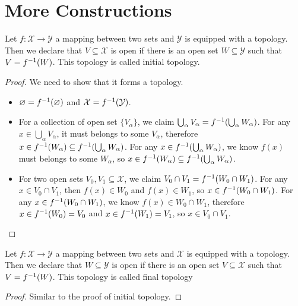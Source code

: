 \documentclass[./main.tex]{subfiles}
\begin{document}
\section{More Constructions}

\begin{definition}
  Let $f : \mathcal{X} \rightarrow \mathcal{Y}$ a mapping between two sets
  and $\mathcal{Y}$ is equipped with a topology.
  Then we declare that $V \subseteq \mathcal{X}$ is open
  if there is an open set $W \subseteq \mathcal{Y}$
  such that $V = f^{-1}(W)$. This topology is called initial topology.
\end{definition}
\begin{proof}
  We need to show that it forms a topology.
  \begin{itemize}
    \item $\varnothing = f^{-1}(\varnothing)$ and $\mathcal{X} = f^{-1}(\mathcal{Y})$.
    \item For a collection of open set $\{ V_\alpha \}$,
          we claim $\bigcup_\alpha V_\alpha = f^{-1}(\bigcup_\alpha W_\alpha)$.
          For any $x \in \bigcup_\alpha V_\alpha$, it must belongs to some $V_\alpha$,
          therefore $x \in f^{-1}(W_\alpha) \subseteq f^{-1}(\bigcup_\alpha W_\alpha)$.
          For any $x \in f^{-1}(\bigcup_\alpha W_\alpha)$, we know $f(x)$ must belongs
          to some $W_\alpha$, so $x \in f^{-1}(W_\alpha) \subseteq f^{-1}(\bigcup_\alpha W_\alpha)$.
    \item For two open sets $V_0, V_1 \subseteq \mathcal{X}$, we claim $V_0 \cap V_1 = f^{-1}(W_0 \cap W_1)$.
          For any $x \in V_0 \cap V_1$, then $f(x) \in W_0$ and $f(x) \in W_1$, so $x \in f^{-1}(W_0 \cap W_1)$.
          For any $x \in f^{-1}(W_0 \cap W_1)$, we know $f(x) \in W_0 \cap W_1$, therefore $x \in f^{-1}(W_0) = V_0$
          and $x \in f^{-1}(W_1) = V_1$, so $x \in V_0 \cap V_1$.
  \end{itemize}
\end{proof}

\begin{definition}
  Let $f : \mathcal{X} \rightarrow \mathcal{Y}$ a mapping between two sets
  and $\mathcal{X}$ is equipped with a topology.
  Then we declare that $W \subseteq \mathcal{Y}$ is open
  if there is an open set $V \subseteq \mathcal{X}$
  such that $V = f^{-1}(W)$. This topology is called final topology
\end{definition}
\begin{proof}
  Similar to the proof of initial topology.
\end{proof}
\end{document}
